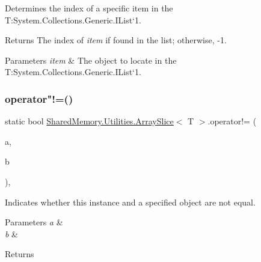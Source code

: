 Determines the index of a specific item in the T\+:\+System.\+Collections.\+Generic.\+I\+List`1.

\begin{DoxyReturn}{Returns}
The index of {\itshape item}  if found in the list; otherwise, -\/1.
\end{DoxyReturn}

\begin{DoxyParams}{Parameters}
{\em item} & The object to locate in the T\+:\+System.\+Collections.\+Generic.\+I\+List`1.\\
\hline
\end{DoxyParams}
\mbox{\label{struct_shared_memory_1_1_utilities_1_1_array_slice_a5f8a8fdd67750a99ceaf1cd713083f41}} 
\subsubsection{\texorpdfstring{operator"!=()}{operator!=()}}
{\footnotesize\ttfamily static bool \hyperlink{struct_shared_memory_1_1_utilities_1_1_array_slice}{Shared\+Memory.\+Utilities.\+Array\+Slice}$<$ T $>$.operator!= (\begin{DoxyParamCaption}\item[{\hyperlink{struct_shared_memory_1_1_utilities_1_1_array_slice}{Array\+Slice}$<$ T $>$}]{a,  }\item[{\hyperlink{struct_shared_memory_1_1_utilities_1_1_array_slice}{Array\+Slice}$<$ T $>$}]{b }\end{DoxyParamCaption})\hspace{0.3cm}{\ttfamily [inline]}, {\ttfamily [static]}}



Indicates whether this instance and a specified object are not equal.


\begin{DoxyParams}{Parameters}
{\em a} & \\
\hline
{\em b} & \\
\hline
\end{DoxyParams}
\begin{DoxyReturn}{Returns}

\end{DoxyReturn}
\mbox{\label{struct_shared_memory_1_1_utilities_1_1_array_slice_a1c49d74991d38b31298164a430abfb0e}} 
